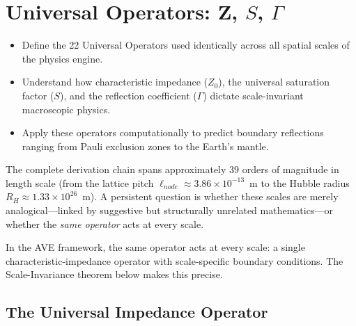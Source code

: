 
\chapter{Universal Operators: Z, $S$, $\Gamma$}
\label{ch:universal_operators}

\begin{objectivebox}
\begin{itemize}
    \item Define the 22 Universal Operators used identically across all spatial scales of the physics engine.
    \item Understand how characteristic impedance ($Z_0$), the universal saturation factor ($S$), and the reflection coefficient ($\Gamma$) dictate scale-invariant macroscopic physics.
    \item Apply these operators computationally to predict boundary reflections ranging from Pauli exclusion zones to the Earth's mantle.
\end{itemize}
\end{objectivebox}

The complete derivation chain spans approximately 39 orders of magnitude
in length scale (from the lattice pitch $\ell_{node} \approx 3.86 \times
10^{-13}$~m to the Hubble radius $R_H \approx 1.33 \times 10^{26}$~m).
A persistent question is whether these scales are merely analogical---linked
by suggestive but structurally unrelated mathematics---or whether the
\textit{same operator} acts at every scale.

In the AVE framework, the same operator acts at every scale: a single
characteristic-impedance operator with scale-specific boundary conditions.
The Scale-Invariance theorem below makes this precise.

\section{The Universal Impedance Operator}
\label{sec:universal_impedance}

\noindent{}

